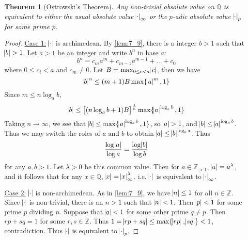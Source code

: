 \documentclass[11pt]{article}
\theoremstyle{definition}
\theoremstyle{plain}
\newtheorem{theorem}[definition]{Theorem}
\theoremstyle{remark}
\newcommand{\ZZ}{\mathbb{Z}}
\newcommand{\QQ}{\mathbb{Q}}
\begin{document}
\begin{theorem}[Ostrowski's Theorem]\label{thm:7_10}
    Any non-trivial absolute value on $\QQ$ is equivalent to either the usual absolute value $\abs{\cdot}_\infty$ or the $p$-adic absolute value $\abs{\cdot}_p$ for some prime $p$.
\end{theorem}
\begin{proof}
    \underline{Case 1:} $\abs{\cdot}$ is archimedean.
    By \autoref{lem:7_9}, there is a integer $b > 1$ such that $\abs{b} > 1$. Let $a > 1$ be an integer and write $b^n$ in base $a$:
    \begin{equation*}
        b^n = c_m a^m + c_{m-1} a^{m-1} + \ldots + c_0
    \end{equation*}
    where $0 \le c_i < a$ and $c_m \neq 0$. Let $B = \max_{0 \le c < a} \abs{c}$, then we have
    \begin{equation*}
        \abs{b}^n \le (m + 1) B \max \{\abs{a}^m, 1\}
    \end{equation*}
    Since $m \le n \log_a{b}$,
    \begin{equation*}
        \abs{b} \le \left[(n \log_a{b} + 1) B \right]^{\frac{1}{n}} \max \{\abs{a}^{\log_a{b}}, 1\}
    \end{equation*}
    Taking $n \to \infty$, we see that $\abs{b} \le \max \{\abs{a}^{\log_a{b}}, 1\}$, so $\abs{a} > 1$, and $\abs{b} \le \abs{a}^{\log_a{b}}$. Thus we may switch the roles of $a$ and $b$ to obtain $\abs{a} \le \abs{b}^{\log_b{a}}$. Thus
    \begin{equation*}
        \frac{\log{\abs{a}}}{\log{a}} = \frac{\log{\abs{b}}}{\log{b}}
    \end{equation*}
    for any $a, b > 1$. Let $\lambda > 0$ be this common value. Then for $a \in \ZZ_{>1}$, $\abs{a} = a^\lambda$, and it follows that for any $x \in \QQ$, $\abs{x} = \abs{x}_\infty^\lambda$, i.e. $\abs{\cdot}$ is equivalent to $\abs{\cdot}_\infty$.

    \underline{Case 2:} $\abs{\cdot}$ is non-archimedean. As in \autoref{lem:7_9}, we have $\abs{n} \le 1$ for all $n \in \ZZ$. Since $\abs{\cdot}$ is non-trivial, there is an $n > 1$ such that $\abs{n} < 1$. Then $\abs{p} < 1$ for some prime $p$ dividing $n$. Suppose that $\abs{q} < 1$ for some other prime $q \neq p$. Then $rp + sq = 1$ for some $r, s \in \ZZ$. Thus $1 = \abs{rp + sq} \le \max\{\abs{rp}, \abs{sq}\} < 1$, contradiction. Thus $\abs{\cdot}$ is equivalent to $\abs{\cdot}_p$.
\end{proof}
\end{document}
